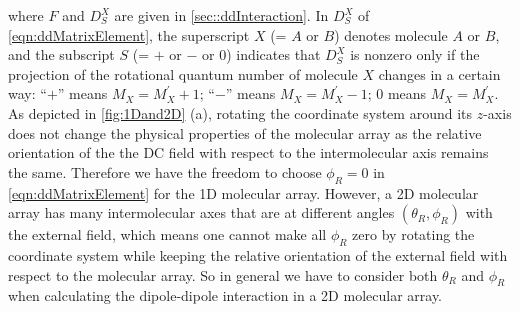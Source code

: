 where $F$ and $D_{S}^{X}$ are given in \autoref{sec::ddInteraction}. In $D_{S}^X$ of \autoref{eqn:ddMatrixElement},  
the superscript $X$  (= $A$ or $B$) denotes molecule $A$ or $B$, and the subscript 
$S$ (= $+$ or $-$ or $0$) indicates that $D_{S}^X$ is nonzero only if 
the projection of the rotational quantum number of molecule $X$ changes in a certain way: 
``$+$'' means  
$M_X = M_X^{'} + 1$;  ``$-$'' means
 $M_X = M_X^{'} - 1$; $0$ means $M_X = M_X^{'}$. 
As depicted in \autoref{fig:1Dand2D} (a), rotating the coordinate system around its $z$-axis does not change the 
physical properties of the molecular array as the relative orientation of the the DC field with respect to the
 intermolecular axis remains the same. Therefore we have the freedom to choose
 $\phi_{R} = 0$ in \autoref{eqn:ddMatrixElement} for the 1D molecular array. However, a 2D molecular array has
 many intermolecular axes that are at different angles $(\theta_{R}, \phi_{R})$ with the external field, which means 
one cannot make all $\phi_{R}$ zero by rotating the coordinate system while keeping the relative orientation of 
the external field with respect to the molecular array. So in general we have to consider both $\theta_{R}$ and 
$\phi_{R}$ when calculating the dipole-dipole interaction in a 2D molecular array.

